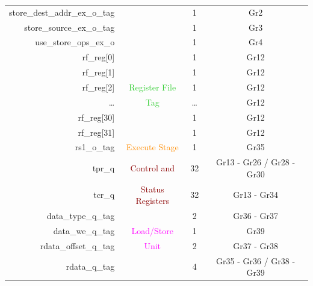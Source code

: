 \begin{table}[t]
\begin{tabular}{@{}rccc@{}}
        store\_dest\_addr\_ex\_o\_tag   &                                       & 1      & Gr2                         \\
        store\_source\_ex\_o\_tag       &                                       & 1      & Gr3                         \\
        use\_store\_ops\_ex\_o          &                                       & 1      & Gr4                         \\\hdashline
        rf\_reg[0]                      &                                       & 1      & Gr12                          \\
        rf\_reg[1]                      &                                       & 1      & Gr12                          \\
        rf\_reg[2]                      & \textcolor{LimeGreen}{Register File}  & 1      & Gr12                          \\
        \ldots                          & \textcolor{LimeGreen}{Tag}            & \ldots & Gr12                          \\
        rf\_reg[30]                     &                                       & 1      & Gr12                          \\
        rf\_reg[31]                     &                                       & 1      & Gr12                          \\\hdashline
        rs1\_o\_tag                     & \textcolor{DarkOrange}{Execute Stage} & 1      & Gr35                            \\\hdashline
        tpr\_q                          & \textcolor{DarkRed}{Control and}      & 32     & Gr13 - Gr26 / Gr28 - Gr30                           \\
        tcr\_q                          & \textcolor{DarkRed}{Status Registers} & 32     & Gr13 - Gr34                          \\\hdashline
        data\_type\_q\_tag              &                                       & 2      & Gr36 - Gr37                            \\
        data\_we\_q\_tag                & \textcolor{magenta}{Load/Store}       & 1      & Gr39                            \\
        rdata\_offset\_q\_tag           & \textcolor{magenta}{Unit}             & 2      & Gr37 - Gr38                            \\
        rdata\_q\_tag                   &                                       & 4      & Gr35 - Gr36 / Gr38 - Gr39                            \\
        \bottomrule
    \end{tabular}
\end{table}

